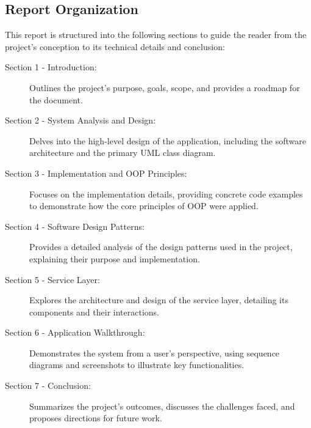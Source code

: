 \subsection{Report Organization}
This report is structured into the following sections to guide the reader from the project's conception to its technical details and conclusion:
\begin{description}
	\item[Section 1 - Introduction:] Outlines the project's purpose, goals, scope, and provides a roadmap for the document.
	\item[Section 2 - System Analysis and Design:] Delves into the high-level design of the application, including the software architecture and the primary UML class diagram.
	\item[Section 3 - Implementation and OOP Principles:] Focuses on the implementation details, providing concrete code examples to demonstrate how the core principles of OOP were applied.
	\item[Section 4 - Software Design Patterns:] Provides a detailed analysis of the design patterns used in the project, explaining their purpose and implementation.
	\item[Section 5 - Service Layer:] Explores the architecture and design of the service layer, detailing its components and their interactions.
	\item[Section 6 - Application Walkthrough:] Demonstrates the system from a user's perspective, using sequence diagrams and screenshots to illustrate key functionalities.
	\item[Section 7 - Conclusion:] Summarizes the project's outcomes, discusses the challenges faced, and proposes directions for future work.
\end{description}